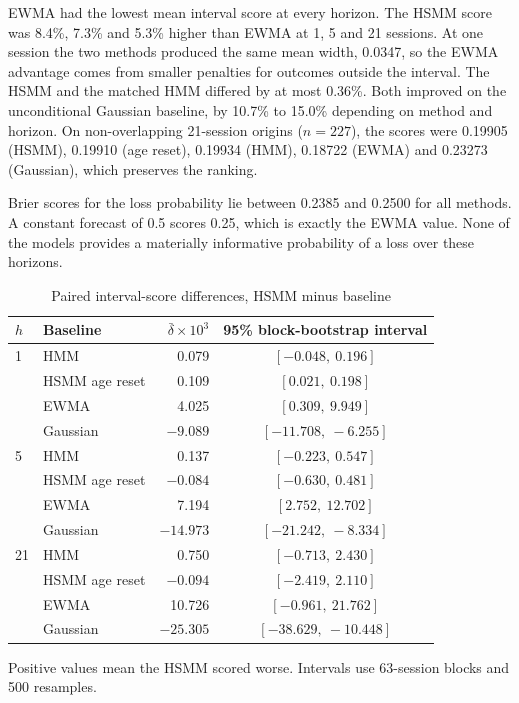 \documentclass[conference]{IEEEtran}
\begin{document}
EWMA had the lowest mean interval score at every horizon. The HSMM score was 8.4\%, 7.3\% and 5.3\% higher than EWMA at 1, 5 and 21 sessions. At one session the two methods produced the same mean width, 0.0347, so the EWMA advantage comes from smaller penalties for outcomes outside the interval. The HSMM and the matched HMM differed by at most 0.36\%. Both improved on the unconditional Gaussian baseline, by 10.7\% to 15.0\% depending on method and horizon. On non-overlapping 21-session origins ($n=227$), the scores were 0.19905 (HSMM), 0.19910 (age reset), 0.19934 (HMM), 0.18722 (EWMA) and 0.23273 (Gaussian), which preserves the ranking.

Brier scores for the loss probability lie between 0.2385 and 0.2500 for all methods. A constant forecast of 0.5 scores 0.25, which is exactly the EWMA value. None of the models provides a materially informative probability of a loss over these horizons.

\begin{table}[t]
\centering
\caption{Paired interval-score differences, HSMM minus baseline}
\label{tab:paired}
\footnotesize
\setlength{\tabcolsep}{5pt}
\begin{tabular}{@{}llrc@{}}
\toprule
$h$ & Baseline & $\bar\delta\times 10^{3}$ & 95\% block-bootstrap interval \\
\midrule
1 & HMM & 0.079 & $[-0.048,\ 0.196]$ \\
  & HSMM age reset & 0.109 & $[0.021,\ 0.198]$ \\
  & EWMA & 4.025 & $[0.309,\ 9.949]$ \\
  & Gaussian & $-9.089$ & $[-11.708,\ -6.255]$ \\
\midrule
5 & HMM & 0.137 & $[-0.223,\ 0.547]$ \\
  & HSMM age reset & $-0.084$ & $[-0.630,\ 0.481]$ \\
  & EWMA & 7.194 & $[2.752,\ 12.702]$ \\
  & Gaussian & $-14.973$ & $[-21.242,\ -8.334]$ \\
\midrule
21 & HMM & 0.750 & $[-0.713,\ 2.430]$ \\
  & HSMM age reset & $-0.094$ & $[-2.419,\ 2.110]$ \\
  & EWMA & 10.726 & $[-0.961,\ 21.762]$ \\
  & Gaussian & $-25.305$ & $[-38.629,\ -10.448]$ \\
\bottomrule
\end{tabular}

\vspace{2pt}
\parbox{\columnwidth}{\scriptsize Positive values mean the HSMM scored worse. Intervals use 63-session blocks and 500 resamples.}
\end{table}
\end{document}
